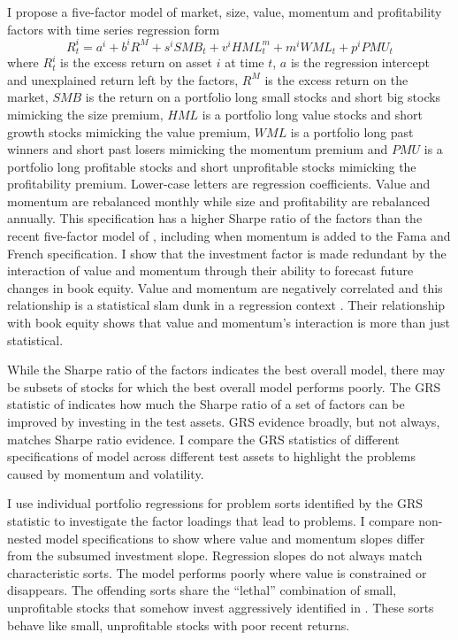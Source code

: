 I propose a five-factor model of market, size, value, momentum and
profitability factors with time series regression form
\begin{equation} \label{eq:B16}
R_t^i = a^i+b^iR^M+s^iSMB_t+v^iHML_t^m+m^iWML_t+p^iPMU_t 
\end{equation}
where $R_t^i$ is the excess return on asset $i$ at time $t$, $a$ is the
regression intercept and unexplained return left by the factors, $R^M$ is the
excess return on the market, $SMB$ is the return on a portfolio long small
stocks and short big stocks mimicking the size premium, $HML$ is a portfolio
long value stocks and short growth stocks mimicking the value premium, $WML$ is
a portfolio long past winners and short past losers mimicking the momentum
premium and $PMU$ is a portfolio long profitable stocks and short unprofitable
stocks mimicking the profitability premium. Lower-case letters are regression
coefficients. Value and momentum are rebalanced monthly while size and
profitability are rebalanced annually. This specification has a higher Sharpe
ratio of the factors than the recent five-factor model of
\textcite{fama2015five}, including when momentum is added to the Fama and
French specification. I show that the investment factor is made redundant by
the interaction of value and momentum through their ability to forecast future
changes in book equity. Value and momentum are negatively correlated and this
relationship is a statistical slam dunk in a regression context
\parencite{asness1997interaction, fama2015incremental}. Their relationship with
book equity shows that value and momentum's interaction is more than just
statistical.

While the Sharpe ratio of the factors indicates the best overall model, there
may be subsets of stocks for which the best overall model performs poorly. The
GRS statistic of \textcite{gibbons1989test} indicates how much the Sharpe ratio
of a set of factors can be improved by investing in the test assets. GRS
evidence broadly, but not always, matches Sharpe ratio evidence. I compare the
GRS statistics of different specifications of model across different test
assets to highlight the problems caused by momentum and volatility.

I use individual portfolio regressions for problem sorts identified by the GRS
statistic to investigate the factor loadings that lead to problems. I compare
non-nested model specifications to show where value and momentum slopes differ
from the subsumed investment slope. Regression slopes do not always match
characteristic sorts. The model performs poorly where value is constrained or
disappears. The offending sorts share the ``lethal” combination of small,
unprofitable stocks that somehow invest aggressively identified in
\textcite{fama2015five, fama2016dissecting}. These sorts behave like small,
unprofitable stocks with poor recent returns.
